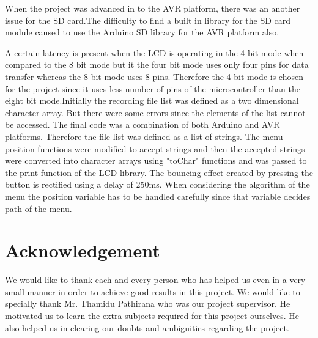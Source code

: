 \documentclass[11pt]{article}
\begin{document}
When the project was advanced in to the AVR platform, there was an another issue for the SD card.The difficulty to find a built in library for the SD card module caused to use the Arduino SD library for the AVR platform also. 

A certain latency is present when the LCD is operating in the 4-bit mode when compared to the 8 bit mode but it the four bit mode uses only four pins for data transfer whereas the 8 bit mode uses 8 pins. Therefore the 4 bit mode is chosen for the project since it uses less number of pins of the microcontroller than the eight bit mode.Initially the recording file list was defined as a two dimensional character array. But there were some errors since the elements of the list cannot be accessed. The final code was a combination of both Arduino and AVR platforms. Therefore the file list was defined as a list of strings. The menu position functions were modified to accept strings and then the accepted strings were converted into character arrays using "toChar" functions and was passed to the print function of the LCD library. The bouncing effect created by pressing the button is rectified using a delay of 250ms. When considering the algorithm of the menu the position variable has to be handled carefully since that variable decides path of the menu. 


\section{Acknowledgement}
We would like to thank each and every person who has helped us even in a very small manner in order to achieve good results in this project. We would like to specially thank Mr. Thamidu Pathirana who was our project supervisor. He motivated us to learn the extra subjects required for this project ourselves. He also helped us in clearing our doubts and ambiguities regarding the project. 



\end{document}
